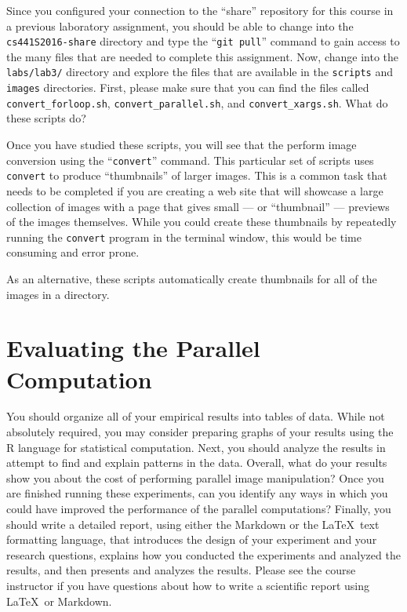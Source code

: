 Since you configured your connection to the ``share'' repository for this course in a previous laboratory assignment,
you should be able to change into the {\tt cs441S2016-share} directory and type the ``{\tt git pull}'' command to gain
access to the many files that are needed to complete this assignment. Now, change into the {\tt labs/lab3/} directory
and explore the files that are available in the {\tt scripts} and {\tt images} directories. First, please make sure that
you can find the files called {\tt convert\_forloop.sh}, {\tt convert\_parallel.sh}, and {\tt convert\_xargs.sh}. What
do these scripts do?

Once you have studied these scripts, you will see that the perform image conversion using the ``{\tt convert}'' command.
This particular set of scripts uses {\tt convert} to produce ``thumbnails'' of larger images. This is a common task that
needs to be completed if you are creating a web site that will showcase a large collection of images with a page that
gives small --- or ``thumbnail'' --- previews of the images themselves. While you could create these thumbnails by
repeatedly running the {\tt convert} program in the terminal window, this would be time consuming and error prone.

As an alternative, these scripts automatically create thumbnails for all of the images in a directory.


\section*{Evaluating the Parallel Computation}


You should organize all of your empirical results into tables of data. While not absolutely required, you may consider
preparing graphs of your results using the R language for statistical computation. Next, you should analyze the results
in attempt to find and explain patterns in the data. Overall, what do your results show you about the cost of performing
parallel image manipulation? Once you are finished running these experiments, can you identify any ways in which you
could have improved the performance of the parallel computations? Finally, you should write a detailed report, using
either the Markdown or the \LaTeX~text formatting language, that introduces the design of your experiment and your
research questions, explains how you conducted the experiments and analyzed the results, and then presents and analyzes
the results.  Please see the course instructor if you have questions about how to write a scientific report using
\LaTeX~or Markdown.

